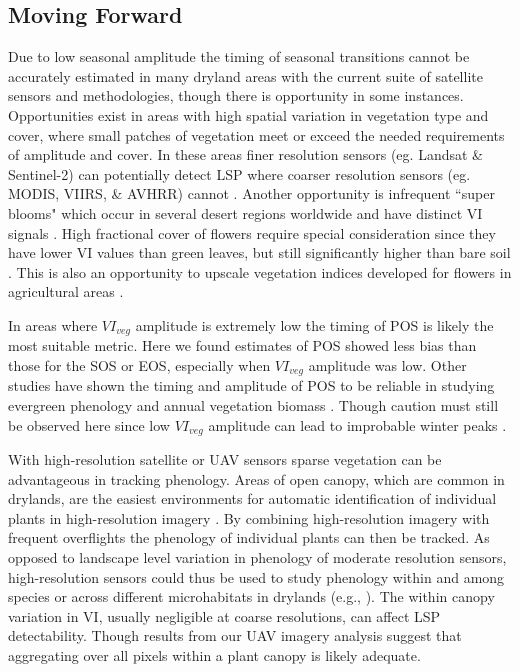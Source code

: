 \documentclass{article}
\begin{document}
\subsection{Moving Forward}
Due to low seasonal amplitude the timing of seasonal transitions cannot be accurately estimated in many dryland areas with the current suite of satellite sensors and methodologies, though there is opportunity in some instances. Opportunities exist in areas with high spatial variation in vegetation type and cover, where small patches of vegetation meet or exceed the needed requirements of amplitude and cover. In these areas finer resolution sensors (eg. Landsat \& Sentinel-2) can potentially detect LSP where coarser resolution sensors (eg. MODIS, VIIRS, \& AVHRR) cannot \cite{peng2021}. Another opportunity is infrequent “super blooms" which occur in several desert regions worldwide and have distinct VI signals \cite{chavez2019}. High fractional cover of flowers require special consideration since they have lower VI values than green leaves, but still significantly higher than bare soil \cite{shen-chen2009}. This is also an opportunity to upscale vegetation indices developed for flowers in agricultural areas \cite{dixon2021, chen-jin2019}.

In areas where $VI_{veg}$ amplitude is extremely low the timing of POS is likely the most suitable metric. Here we found estimates of POS showed less bias than those for the SOS or EOS, especially when $VI_{veg}$ amplitude was low. Other studies have shown the timing and amplitude of POS to be reliable in studying evergreen phenology \cite{walker2014, walker2015} and annual vegetation biomass \cite{casady2013}. Though caution must still be observed here since low $VI_{veg}$ amplitude can lead to improbable winter peaks \cite{norris2020}.

With high-resolution satellite or UAV sensors sparse vegetation can be advantageous in tracking phenology. Areas of open canopy, which are common in drylands, are the easiest environments for automatic identification of individual plants in high-resolution imagery \cite{weinstein2020}. By combining high-resolution imagery with frequent overflights the phenology of individual plants can then be tracked. As opposed to landscape level variation in phenology of moderate resolution sensors, high-resolution sensors could thus be used to study phenology within and among species or across different microhabitats in drylands (e.g., \cite{browning2017b}). The within canopy variation in VI, usually negligible at coarse resolutions, can affect LSP detectability. Though results from our UAV imagery analysis suggest that aggregating over all pixels within a plant canopy is likely adequate. 
\end{document}
